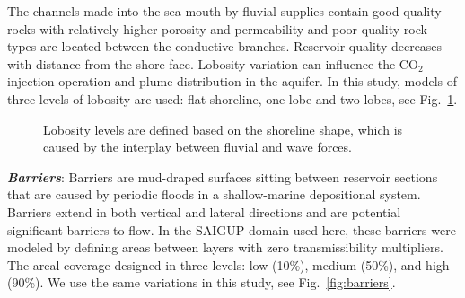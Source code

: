 The channels made into the sea mouth by fluvial supplies contain good quality
rocks with relatively higher porosity and permeability and poor quality rock
types are located between the conductive branches. Reservoir quality decreases
with distance from the shore-face. Lobosity variation can influence the CO$_2$
injection operation and plume distribution in the aquifer. In this study, models
of three levels of lobosity are used: flat shoreline, one lobe and two lobes,
see Fig.~\ref{fig:lobCauses}.

 
\begin{figure}[tbp]%
  
   \hspace{0.5cm}
  \hspace{0.5cm}

  \caption{Lobosity levels are defined based on the shoreline shape, which is
caused by the interplay between fluvial and wave forces.}
 \label{fig:lobCauses}
\end{figure}

\textbf{\textit{Barriers}}: 
Barriers are mud-draped surfaces sitting between reservoir sections that are
caused by periodic floods in a shallow-marine depositional system. Barriers
extend in both vertical and lateral directions and are potential significant
barriers to
flow.  In the SAIGUP domain used here, these barriers were modeled by defining
areas between layers with zero transmissibility multipliers. The areal coverage
designed in three levels: low (10\%), medium
(50\%), and high (90\%). We use the same variations in this study, see
Fig.~\ref{fig:barriers}.


